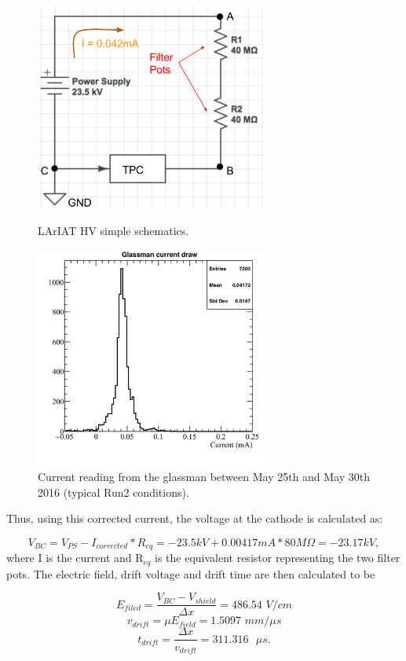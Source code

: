 \begin{figure}[hp]
\centering
\begin{minipage}{0.45\textwidth}
\centering
\includegraphics[width=3in]{images/CircuitLArIAT.png}
\caption{LArIAT HV simple schematics.}
\label{fig:circuit}
\end{minipage}\hfill
\begin{minipage}{0.45\textwidth}
\centering
\includegraphics[width=3in]{images/glassman_current_20160525-30.png}
\caption{Current reading from the glassman between May 25th and May 30th 2016 (typical Run2 conditions).}
\label{fig:currentMeasurement}
\end{minipage}
\end{figure}

Thus, using this corrected current, the voltage at the cathode is calculated as:

\begin{equation} V_{BC}=V_{PS} - I_{corrected}*R_{eq} = -23.5kV + 0.00417mA*80M\Omega = -23.17 kV, \label{eq:VBC}
\end{equation}
where I is the current and R$_{eq}$ is the equivalent resistor representing the two filter pots. The electric field, drift voltage and drift time are then calculated to be

\begin{equation}E_{filed} = \frac{V_{BC} - V_{shield}}{\Delta x} = 486.54 \textit{ V/cm}
\end{equation}
\begin{equation}v_{drift} = \mu E_{field} = 1.5097 \textit{ mm/$\mu$s}
\end{equation}
\begin{equation}t_{drift} = \frac{\Delta x}{v_{drift}} = 311.316 \textit{ $\mu$s.}
\end{equation}


